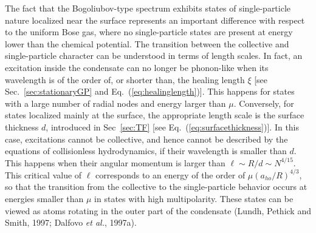 The fact that the Bogoliubov-type  spectrum exhibits states of 
single-particle nature localized near the surface represents an important 
difference with respect to the uniform Bose gas, where no single-particle 
states are present at energy lower than the chemical potential. The 
transition between the collective and single-particle character can be 
understood in terms of length scales. In fact, an excitation inside the
condensate can no longer be phonon-like when its wavelength is of the
order of, or shorter than, the healing length $\xi$ [see
Sec.~\ref{sec:stationaryGP}  and Eq.~(\ref{eq:healinglength})]. This
happens for states with a large number  of radial nodes and energy
larger than $\mu$. Conversely, for states localized mainly at the
surface, the appropriate length scale is the surface thickness $d$,
introduced in Sec~\ref{sec:TF} [see Eq.~(\ref{eq:surfacethickness})].
In this case, excitations cannot be collective, and hence cannot be 
described by the equations of collisionless hydrodynamics, if their 
wavelength is smaller than $d$. This happens when their angular momentum 
is larger than $\ell \sim R/d\sim N^{4/15}$. This critical value of $\ell$ 
corresponds to an energy of the order of $\mu (a_{ho}/R)^{4/3}$, 
so that the transition from the collective to the single-particle behavior 
occurs at energies smaller than $\mu$ in states with high multipolarity.
These states can be viewed as atoms rotating in the outer part of the 
condensate (Lundh, Pethick and Smith, 1997; Dalfovo {\it et al.}, 1997a).

